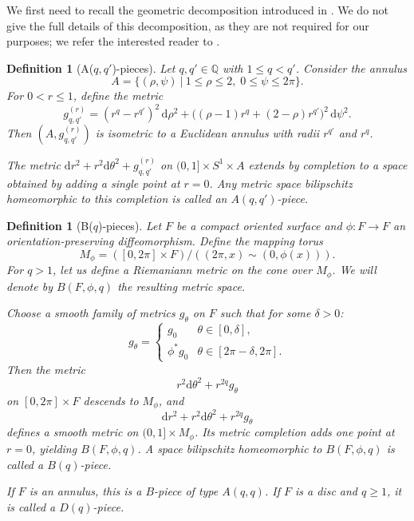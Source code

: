 \documentclass[reqno,dvipsnames,12pt]{amsart}
\newtheorem{defi}[thm]{Definition}
\begin{document}

We first need to  recall the geometric decomposition introduced in \cite{BNP}. We do not give the full details of this decomposition, as they are not required for our purposes; we refer the interested reader to  \cite[Section 7.5.1]{pichonintroduction}.


\begin{defi}[A($q,q'$)-pieces]
Let $q,q' \in \mathbb{Q}$ with $1 \le q < q'$. Consider the annulus
\[
A = \{(\rho,\psi) \ | \ 1 \le \rho \le 2,\; 0 \le \psi \le 2\pi\}.
\]
For $0 < r \le 1$, define the metric
\[
g^{(r)}_{q,q'} = (r^q - r^{q'})^2\, \mathrm{d}\rho^2 
+ \big((\rho-1)r^q + (2-\rho)r^{q'}\big)^2\, \mathrm{d}\psi^2.
\]
Then $(A, g^{(r)}_{q,q'})$ is isometric to a Euclidean annulus with radii $r^{q'}$ and $r^q$.


The metric $\mathrm{d}r^2 + r^2 \mathrm{d}\theta^2 + g^{(r)}_{q,q'}$
on $(0,1]\times S^1 \times A$ extends by completion to a space obtained by adding a single point at $r=0$.
Any metric space bilipschitz homeomorphic to this completion is called an $A(q,q')$-piece.
\end{defi}
\begin{defi}[B($q$)-pieces]
    


Let $F$ be a compact oriented surface and $\phi: F \to F$ an orientation-preserving diffeomorphism.
Define the mapping torus
\[
M_\phi = ([0,2\pi]\times F)/((2\pi,x)\sim(0,\phi(x))).
\]
For $q>1$, let us define a Riemaniann metric on the cone over $M_\phi$. We will  denote by   $B(F,\phi,q)$ the resulting metric space.

Choose a smooth family of metrics $g_\theta$ on $F$ such that for some $\delta>0$:
\[
g_\theta =
\begin{cases}
g_0 & \theta \in [0,\delta],\\
\phi^* g_0 & \theta \in [2\pi-\delta,2\pi].
\end{cases}
\]
Then the metric
\[
r^2 \mathrm{d}\theta^2 + r^{2q} g_\theta
\]
on $[0,2\pi]\times F$ descends to $M_\phi$, and
\[
\mathrm{d}r^2 + r^2 \mathrm{d}\theta^2 + r^{2q} g_\theta
\]
defines a smooth metric on $(0,1]\times M_\phi$.
Its metric completion adds one point at $r=0$, yielding $B(F,\phi,q)$. A space bilipschitz homeomorphic to $B(F,\phi,q)$ is called a $B(q)$-piece.

If $F$ is an annulus, this is a $B$-piece of type $A(q,q)$.
If $F$ is a disc and $q \ge 1$, it is called a $D(q)$-piece.
\end{defi}
\end{document}
